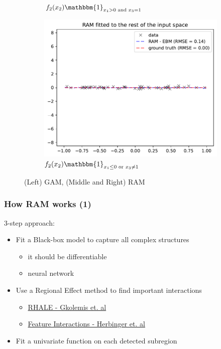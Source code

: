 \documentclass{beamer}
\newcommand{\when}[1]{\mathbbm{1}_{#1}}
\begin{document}
\begin{frame}
\begin{figure}[htbp]
\begin{subfigure}{0.32\textwidth}
        \caption{\(f_2(x_2) \when{x_1 > 0 \text{ and } x_3 = 1}\)}
        \label{subfig:regional_gam_1}
    \end{subfigure}
    \begin{subfigure}{0.32\textwidth}
        \centering
        \includegraphics[width=\textwidth]{figures/regional_gam_subreg_2}
        \caption{\(f_2(x_2) \when{x_1 \leq 0 \text{ or } x_3 \neq 1}\)}
        \label{subfig:regional_gam_2}
    \end{subfigure}
    \caption{(Left) GAM, (Middle and Right) RAM}
    \label{fig:ram_example}
\end{figure}
\end{frame}


\begin{frame}
  \frametitle{How RAM works (1)}

  3-step approach:

  \begin{itemize}
  \item Fit a Black-box model to capture all complex structures
    \begin{itemize}
    \item it should be differentiable
    \item neural network
  \end{itemize}
\item Use a Regional Effect method to find important interactions
  \begin{itemize}
  \item \href{https://givasile.github.io/assets/pdf/gkolemis23_rhale.pdf}{RHALE - Gkolemis et. al}
  \item \href{https://arxiv.org/pdf/2306.00541.pdf}{Feature Interactions - Herbinger et. al}
  \end{itemize}

  \item Fit a univariate function on each detected subregion

  \end{itemize}

\end{frame}
\end{document}
